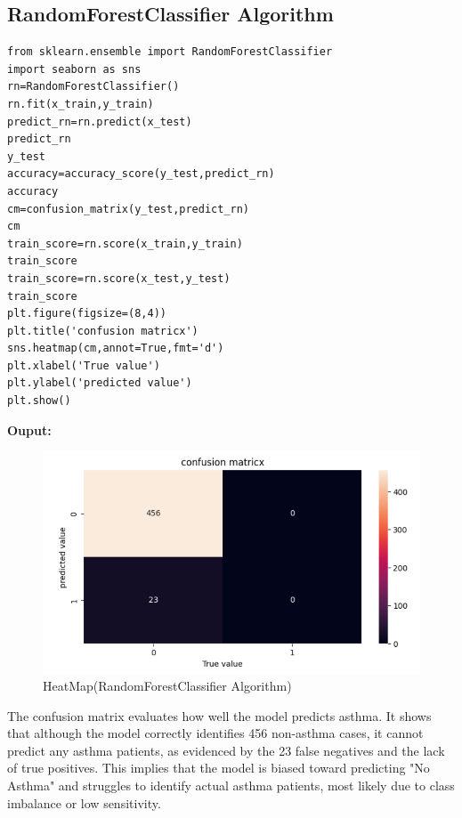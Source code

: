 \subsection{RandomForestClassifier Algorithm}
\begin{verbatim}
from sklearn.ensemble import RandomForestClassifier
import seaborn as sns
rn=RandomForestClassifier()
rn.fit(x_train,y_train)
predict_rn=rn.predict(x_test)
predict_rn
y_test
accuracy=accuracy_score(y_test,predict_rn)
accuracy
cm=confusion_matrix(y_test,predict_rn)
cm
train_score=rn.score(x_train,y_train)
train_score
train_score=rn.score(x_test,y_test)
train_score
plt.figure(figsize=(8,4))
plt.title('confusion matricx')
sns.heatmap(cm,annot=True,fmt='d')
plt.xlabel('True value')
plt.ylabel('predicted value')
plt.show()
\end{verbatim}
\textbf{Ouput:}
\begin{figure}[h]
\centering
\includegraphics[width=0.7\linewidth]{Images/r2.png}
\caption{HeatMap(RandomForestClassifier Algorithm)}
\label{fig:enter-label}
\end{figure}
The confusion matrix evaluates how well the model predicts asthma. It shows that although the model correctly identifies 456 non-asthma cases, it cannot predict any asthma patients, as evidenced by the 23 false negatives and the lack of true positives. This implies that the model is biased toward predicting "No Asthma" and struggles to identify actual asthma patients, most likely due to class imbalance or low sensitivity.

